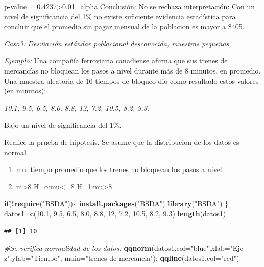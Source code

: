 \documentclass[
]{article}
\newenvironment{Shaded}{\begin{snugshade}}{\end{snugshade}}
\newcommand{\AttributeTok}[1]{\textcolor[rgb]{0.13,0.29,0.53}{#1}}
\newcommand{\CommentTok}[1]{\textcolor[rgb]{0.56,0.35,0.01}{\textit{#1}}}
\newcommand{\ControlFlowTok}[1]{\textcolor[rgb]{0.13,0.29,0.53}{\textbf{#1}}}
\newcommand{\DecValTok}[1]{\textcolor[rgb]{0.00,0.00,0.81}{#1}}
\newcommand{\FloatTok}[1]{\textcolor[rgb]{0.00,0.00,0.81}{#1}}
\newcommand{\FunctionTok}[1]{\textcolor[rgb]{0.13,0.29,0.53}{\textbf{#1}}}
\newcommand{\NormalTok}[1]{#1}
\newcommand{\OtherTok}[1]{\textcolor[rgb]{0.56,0.35,0.01}{#1}}
\newcommand{\SpecialCharTok}[1]{\textcolor[rgb]{0.81,0.36,0.00}{\textbf{#1}}}
\newcommand{\StringTok}[1]{\textcolor[rgb]{0.31,0.60,0.02}{#1}}
\begin{document}
p-value = 0.4237\textgreater0.01=alpha Conclusión: No se rechaza
interpretación: Con un nivel de significancia del 1\% no existe
suficiente evidencia estadística para concluir que el promedio sin pagar
mensual de la poblacion es mayor a \$405.

\emph{Caso3: Desviación estándar poblacional desconocida, muestras
pequeñas}

\emph{Ejemplo:} Una compañía ferroviaria canadiense afirma que sus
trenes de mercancías no bloquean los pasos a nivel durante más de 8
minutos, en promedio. Una muestra aleatoria de 10 tiempos de bloqueo dio
como resultado estos valores (en minutos):

\emph{10.1, 9.5, 6.5, 8.0, 8.8, 12, 7.2, 10.5, 8.2, 9.3. }

Bajo un nivel de significancia del 1\%.

Realice la prueba de hipotesis. Se asume que la distribucion de los
datos es normal.

\begin{enumerate}
\def\labelenumi{\arabic{enumi}.}
\item
  mu: tiempo promedio que los trenes no bloquean los pasos a nivel.
\item
  m\textgreater8 H\_o:mu\textless=8 H\_1:mu\textgreater8
\end{enumerate}

\begin{Shaded}
\begin{Highlighting}[]
\ControlFlowTok{if}\NormalTok{(}\SpecialCharTok{!}\FunctionTok{require}\NormalTok{(}\StringTok{"BSDA"}\NormalTok{))\{}
\FunctionTok{install.packages}\NormalTok{(}\StringTok{"BSDA"}\NormalTok{)}
\FunctionTok{library}\NormalTok{(}\StringTok{"BSDA"}\NormalTok{)}
\NormalTok{\}}
\NormalTok{datos1}\OtherTok{=}\FunctionTok{c}\NormalTok{(}\FloatTok{10.1}\NormalTok{, }\FloatTok{9.5}\NormalTok{, }\FloatTok{6.5}\NormalTok{, }\FloatTok{8.0}\NormalTok{, }\FloatTok{8.8}\NormalTok{, }\DecValTok{12}\NormalTok{, }\FloatTok{7.2}\NormalTok{, }\FloatTok{10.5}\NormalTok{, }\FloatTok{8.2}\NormalTok{, }\FloatTok{9.3}\NormalTok{)}
\FunctionTok{length}\NormalTok{(datos1)}
\end{Highlighting}
\end{Shaded}

\begin{verbatim}
## [1] 10
\end{verbatim}

\begin{Shaded}
\begin{Highlighting}[]
\CommentTok{\#Se verifica normalidad de los datos.}
\FunctionTok{qqnorm}\NormalTok{(datos1,}\AttributeTok{col=}\StringTok{"blue"}\NormalTok{,}\AttributeTok{xlab=}\StringTok{"Eje z"}\NormalTok{,}\AttributeTok{ylab=}\StringTok{"Tiempo"}\NormalTok{, }\AttributeTok{main=}\StringTok{"trenes de mercancia"}\NormalTok{); }\FunctionTok{qqline}\NormalTok{(datos1,}\AttributeTok{col=}\StringTok{"red"}\NormalTok{)}
\end{Highlighting}
\end{Shaded}
\end{document}
